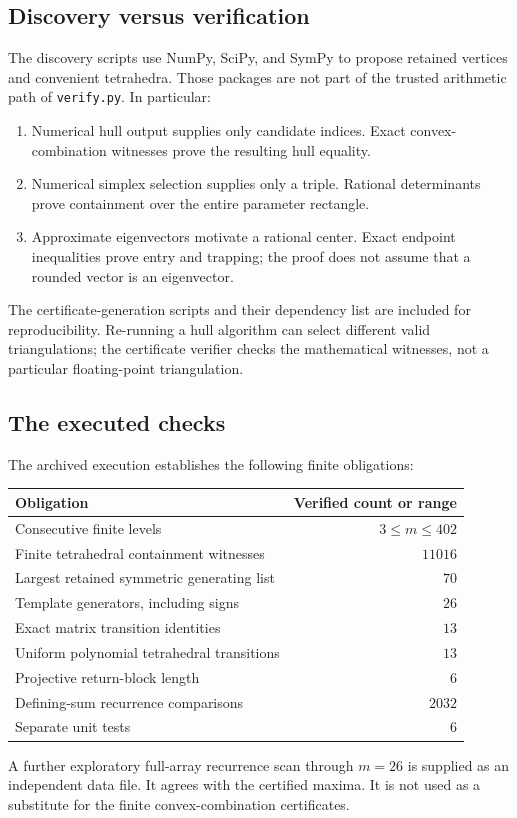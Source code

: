 \documentclass[11pt,a4paper]{article}
\theoremstyle{definition}\newtheorem{definition}[theorem]{Definition}
\theoremstyle{remark}\newtheorem{remark}[theorem]{Remark}
\begin{document}
\subsection{Discovery versus verification}
The discovery scripts use NumPy, SciPy, and SymPy to propose retained
vertices and convenient tetrahedra. Those packages are not part of the
trusted arithmetic path of \texttt{verify.py}. In particular:
\begin{enumerate}[leftmargin=2em,itemsep=0.15em]
\item Numerical hull output supplies only candidate indices. Exact
convex-combination witnesses prove the resulting hull equality.
\item Numerical simplex selection supplies only a triple. Rational
determinants prove containment over the entire parameter rectangle.
\item Approximate eigenvectors motivate a rational center. Exact endpoint
inequalities prove entry and trapping; the proof does not assume that a
rounded vector is an eigenvector.
\end{enumerate}
The certificate-generation scripts and their dependency list are included for
reproducibility. Re-running a hull algorithm can select different valid
triangulations; the certificate verifier checks the mathematical witnesses,
not a particular floating-point triangulation.

\subsection{The executed checks}
The archived execution establishes the following finite obligations:
\begin{center}
\begin{tabular}{lr}
\toprule
Obligation & Verified count or range\\\midrule
Consecutive finite levels & $3\le m\le402$\\
Finite tetrahedral containment witnesses & $11016$\\
Largest retained symmetric generating list & $70$\\
Template generators, including signs & $26$\\
Exact matrix transition identities & $13$\\
Uniform polynomial tetrahedral transitions & $13$\\
Projective return-block length & $6$\\
Defining-sum recurrence comparisons & $2032$\\
Separate unit tests & $6$\\\bottomrule
\end{tabular}
\end{center}
A further exploratory full-array recurrence scan through $m=26$ is supplied
as an independent data file. It agrees with the certified maxima. It is not
used as a substitute for the finite convex-combination certificates.
\end{document}

